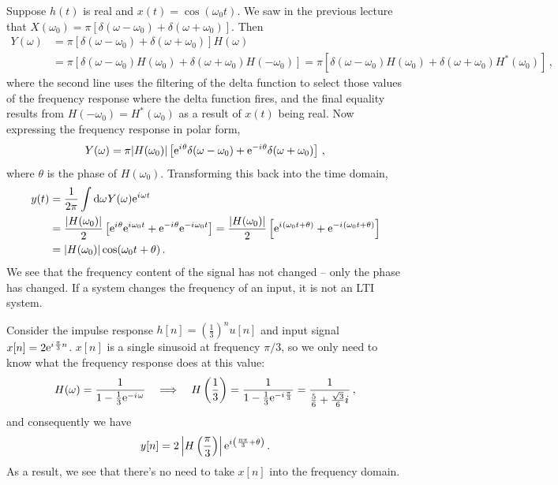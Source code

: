 \begin{exmp}
  Suppose $h(t)$ is real and $x(t) = \cos(\omega_0 t)$. We saw in the previous
  lecture that $X(\omega_0) = \pi[\delta(\omega-\omega_0) + \delta(\omega+\omega_0)]$.
  Then
  \begin{align*}
    Y(\omega) &= \pi[\delta(\omega-\omega_0) + \delta(\omega+\omega_0)]H(\omega) \\
    &= \pi[\delta(\omega-\omega_0)H(\omega_0) + \delta(\omega+\omega_0)H(-\omega_0)]
    = \pi[\delta(\omega-\omega_0)H(\omega_0) + \delta(\omega+\omega_0)H^*(\omega_0)] \,,
  \end{align*}
  where the second line uses the filtering of the delta function to select those
  values of the frequency response where the delta function fires, and the final
  equality results from $H(-\omega_0) = H^*(\omega_0)$ as a result of $x(t)$ being
  real. Now expressing the frequency response in polar form,
  \begin{displaymath}
    Y(\omega) = \pi |H(\omega_0)|\left[
      \mathrm{e}^{{i\mkern1mu}\theta}\delta(\omega-\omega_0) + \mathrm{e}^{-{i\mkern1mu}\theta}\delta(\omega+\omega_0)
    \right] \,,
  \end{displaymath}
  where $\theta$ is the phase of $H(\omega_0)$. Transforming this back into the time
  domain,
  \begin{align*}
    y(t) &= \frac{1}{2\pi}\int\mathrm{d}\omega\mkern1muY(\omega)\mathrm{e}^{{i\mkern1mu}\omega t} \\
    &= \frac{|H(\omega_0)|}{2} \left[
      \mathrm{e}^{{i\mkern1mu}\theta}\mathrm{e}^{{i\mkern1mu}\omega_0 t} + \mathrm{e}^{-{i\mkern1mu}\theta}\mathrm{e}^{-{i\mkern1mu}\omega_0 t}
      \right] = \frac{|H(\omega_0)|}{2} \left[
      \mathrm{e}^{{i\mkern1mu}(\omega_0 t + \theta)} + \mathrm{e}^{-{i\mkern1mu}(\omega_0 t + \theta)}
      \right] \\
    &= |H(\omega_0)|\cos(\omega_0 t + \theta) \,.
  \end{align*}
  We see that the frequency content of the signal has not changed -- only the phase
  has changed. If a system changes the frequency of an input, it is not an LTI system.
\end{exmp}
%
\begin{exmp}
  Consider the impulse response $h[n] = \left(\frac{1}{3}\right)^n u[n]$ and input
  signal $x[n] = 2\mathrm{e}^{{i\mkern1mu}\frac{\pi}{3}n}$. $x[n]$ is a single sinusoid at frequency
  $\pi/3$, so we only need to know what the frequency response does at this value:
  \begin{displaymath}
    H(\omega) = \frac{1}{1 - \frac{1}{3}\mathrm{e}^{-{i\mkern1mu}\omega}} \quad\Longrightarrow\quad
    H\left(\frac{1}{3}\right) = \frac{1}{1 - \frac{1}{3}\mathrm{e}^{-{i\mkern1mu}\frac{\pi}{3}}}
    = \frac{1}{\frac{5}{6} + \frac{\sqrt{3}}{6}{i\mkern1mu}} \,,
  \end{displaymath}
  and consequently we have
  \begin{displaymath}
    y[n] = 2 \left|H\left(\frac{\pi}{3}\right)\right| \mathrm{e}^{{i\mkern1mu}\left(\frac{n\pi}{3} + \theta\right)} \,.
  \end{displaymath}
  As a result, we see that there's no need to take $x[n]$ into the frequency domain.
\end{exmp}

